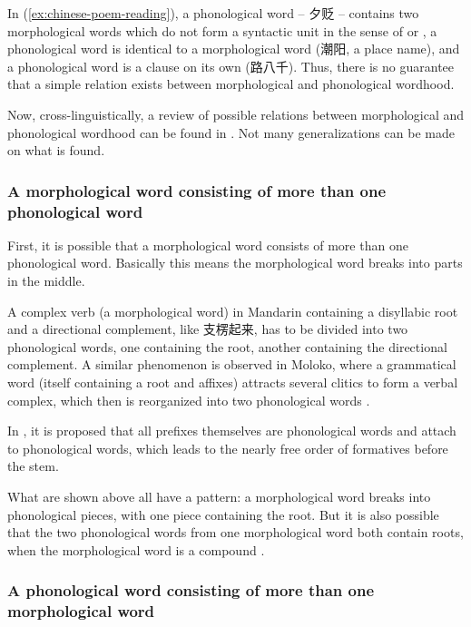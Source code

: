 \documentclass[a4paper, oneside, scheme=plain, 12pt]{article}
\newcommand*{\citesec}[1]{\S~{#1}}
\newcommand*{\citepage}[1]{p.~{#1}}
\begin{document}
In (\ref{ex:chinese-poem-reading}), a phonological word -- 夕贬 -- contains
two morphological words which do not form a syntactic unit
in the sense of  or ,
a phonological word is identical to a morphological word (潮阳, a place name),
and a phonological word is a clause on its own (路八千).
Thus, there is no guarantee that a simple relation exists between morphological and phonological wordhood.

Now, cross-linguistically, a review of possible relations between morphological and phonological wordhood can be found in \citet[\citesec{10.6}]{dixon2010basic2}.
Not many generalizations can be made on what is found.

\subsubsection{A morphological word consisting of more than one phonological word}\label{sec:phonological-multiple-phonological-one-morphological}

First, it is possible that a morphological word consists of more than one phonological word.
Basically this means the morphological word breaks into parts in the middle.

A complex verb (a morphological word) in Mandarin containing a disyllabic root and a directional complement,
like 支楞起来, has to be divided into two phonological words,
one containing the root, another containing the directional complement.
A similar phenomenon is observed in Moloko, where a grammatical word (itself containing a root and affixes) 
attracts several clitics to form a verbal complex,
which then is reorganized into two phonological words \citep[\citepage{202}]{Friesen2017}.

In \citet{bickel2007free}, it is proposed that all prefixes themselves are phonological words and attach to phonological words,
which leads to the nearly free order of formatives before the stem.

What are shown above all have a pattern:
a morphological word breaks into phonological pieces,
with one piece containing the root.
But it is also possible that the two phonological words from one morphological word
both contain roots, when the morphological word is a compound \citep[\citepage{23}]{dixon2010basic2}.

\subsubsection{A phonological word consisting of more than one morphological word}\label{sec:phonological-multiple-morphological-one-phonological}
\end{document}
